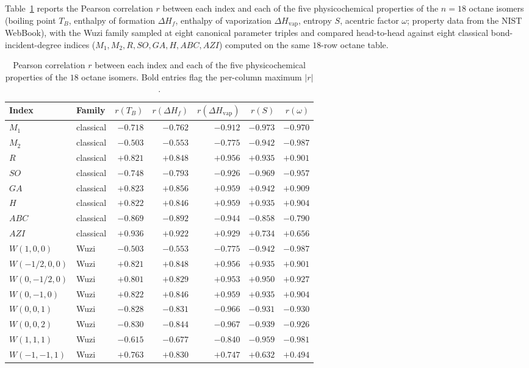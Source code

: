 \documentclass[a5paper, 10pt]{article}
\theoremstyle{plain}
\theoremstyle{remark}
\theoremstyle{definition}
\begin{document}
Table~\ref{tab:octane_competitor} reports the Pearson correlation
$r$ between each index and each of the five physicochemical
properties of the $n = 18$ octane isomers (boiling point $T_B$,
enthalpy of formation $\Delta H_f$, enthalpy of vaporization
$\Delta H_{\mathrm{vap}}$, entropy $S$, acentric factor $\omega$;
property data from the NIST WebBook), with the Wuzi family
sampled at eight canonical parameter triples and compared
head-to-head against eight classical bond-incident-degree indices
($M_1, M_2, R, SO, GA, H, ABC, AZI$) computed on the same
$18$-row octane table.

\begin{table}[H]
\centering
\caption{Pearson correlation $r$ between each index and each of the five physicochemical properties of the $18$ octane isomers. Bold entries flag the per-column maximum $|r|$.}
\label{tab:octane_competitor}
\small
\begin{tabular}{llrrrrr}
\toprule
Index & Family & $r(T_B)$ & $r(\Delta H_f)$ & $r(\Delta H_{\mathrm{vap}})$ & $r(S)$ & $r(\omega)$\\
\midrule
$M_1$              & classical & $-0.718$ & $-0.762$ & $-0.912$ & $-0.973$ & $-0.970$\\
$M_2$              & classical & $-0.503$ & $-0.553$ & $-0.775$ & $-0.942$ & $-0.987$\\
$R$                & classical & $+0.821$ & $+0.848$ & $+0.956$ & $+0.935$ & $+0.901$\\
$SO$               & classical & $-0.748$ & $-0.793$ & $-0.926$ & $-0.969$ & $-0.957$\\
$GA$               & classical & $+0.823$ & $+0.856$ & $+0.959$ & $+0.942$ & $+0.909$\\
$H$                & classical & $+0.822$ & $+0.846$ & $+0.959$ & $+0.935$ & $+0.904$\\
$ABC$              & classical & $-0.869$ & $-0.892$ & $-0.944$ & $-0.858$ & $-0.790$\\
$AZI$              & classical & $\mathbf{+0.936}$ & $\mathbf{+0.922}$ & $+0.929$ & $+0.734$ & $+0.656$\\
\midrule
$W(1, 0, 0)$       & Wuzi      & $-0.503$ & $-0.553$ & $-0.775$ & $-0.942$ & $\mathbf{-0.987}$\\
$W(-1/2, 0, 0)$    & Wuzi      & $+0.821$ & $+0.848$ & $+0.956$ & $+0.935$ & $+0.901$\\
$W(0, -1/2, 0)$    & Wuzi      & $+0.801$ & $+0.829$ & $+0.953$ & $+0.950$ & $+0.927$\\
$W(0, -1, 0)$      & Wuzi      & $+0.822$ & $+0.846$ & $+0.959$ & $+0.935$ & $+0.904$\\
$W(0, 0, 1)$       & Wuzi      & $-0.828$ & $-0.831$ & $-0.966$ & $-0.931$ & $-0.930$\\
$W(0, 0, 2)$       & Wuzi      & $-0.830$ & $-0.844$ & $\mathbf{-0.967}$ & $-0.939$ & $-0.926$\\
$W(1, 1, 1)$       & Wuzi      & $-0.615$ & $-0.677$ & $-0.840$ & $-0.959$ & $-0.981$\\
$W(-1, -1, 1)$     & Wuzi      & $+0.763$ & $+0.830$ & $+0.747$ & $+0.632$ & $+0.494$\\
\bottomrule
\end{tabular}


\end{table}
\end{document}
